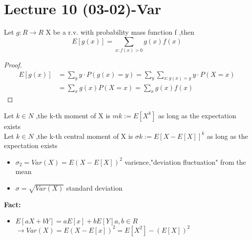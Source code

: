 \section{Lecture 10 (03-02)-{Var}}
\begin{lemma}{}
Let $ g:R\rightarrow R$ X be a r.v. with probability mass function f ,then $$
    E[g(x)]=\sum_{x:f(x)>0}g(x)f(x)
$$ 
\end{lemma}
\begin{proof}
    \begin{align*}{}{}
    E[g(x)]&=\sum_{y}y\cdot P(g(x)=y)=\sum_{y}\sum_{x:g(x)=y}y\cdot P(X=x)\\
       &=\sum_{x}g(x)P(X=x)=\sum_{x}g(x)f(x)
    \end{align*}
\end{proof}
\begin{definition}[]{}
Let $ k\in N $ ,the k-th moment of X is $ mk:= E[X^k] $ as long as the expectation exists\\
Let $ k\in N $ ,the k-th central moment of X is $ \sigma k:= E[X-E[X]]^k $ as long as the expectation exists\\
\begin{itemize}
\item $ \sigma_2=Var (X)=E(X-E[X])^2 $ varience,"deviation fluctuation" from the mean
\item $ \sigma=\sqrt{Var(X)} $ standard deviation
\end{itemize}
\end{definition}
\textbf{Fact:}
\begin{itemize}
\item $ E[aX+bY]=aE[x]+bE[Y] a,b \in R$ \\
$\rightarrow Var(X)=E(X-E[x])^2=E[X^2]-(E[X])^2$
\end{itemize}
